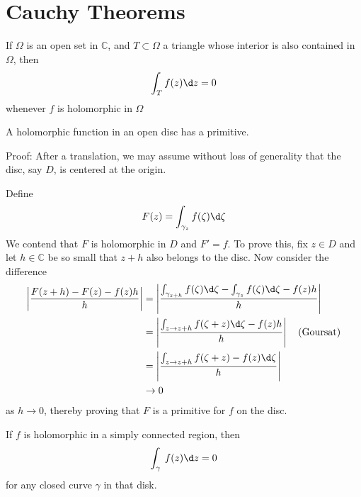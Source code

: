 \documentclass[12pt, oneside]{book}
\begin{document}
\section{Cauchy Theorems}
\begin{theorem}[Goursat's]
    If $\Omega$ is an open set in $\mathbb{C}$, and $T\subset\Omega$ a triangle whose interior is also contained in $\Omega$, then
    $$\int_T f(z)\d z=0$$
    whenever $f$ is holomorphic in $\Omega$
\end{theorem}
\begin{theorem}
    A holomorphic function in an open disc has a primitive.

    Proof:
    After a translation, we may assume without loss of generality that the disc, say $D$, is centered at the origin.

    Define
    \[
        F(z)=\int_{\gamma_z}f(\zeta)\d \zeta
    \]
    We contend that $F$ is holomorphic in $D$ and $F'=f$. To prove this, fix $z\in D$ and let $h\in\mathbb{C}$ be so small that $z + h$ also belongs to the disc. Now consider the difference
    $$\begin{aligned}
            \left|\frac{F(z+h)-F(z)-f(z)h}{h}\right| &
            =\left|\frac{\int_{\gamma_{z+h}}f(\zeta)\d \zeta-\int_{\gamma_z}f(\zeta)\d \zeta-f(z)h}{h}\right|                               \\
                                                     & =\left|\frac{\int_{z\to z+h}f(\zeta+z)\d \zeta-f(z)h}{h}\right|\quad\text{(Goursat)} \\
                                                     & =\left|\frac{\int_{z\to z+h}f(\zeta+z)-f(z)\d \zeta}{h}\right|                       \\
                                                     & \to 0
        \end{aligned}$$
    as $h\to 0$, thereby proving that $F$ is a primitive for $f$ on the disc.
\end{theorem}
\begin{theorem}
    If $f$ is holomorphic in a simply connected region, then
    $$\int_\gamma\: f(z)\d z=0$$
    for any closed curve $\gamma$ in that disk.
\end{theorem}
\end{document}
